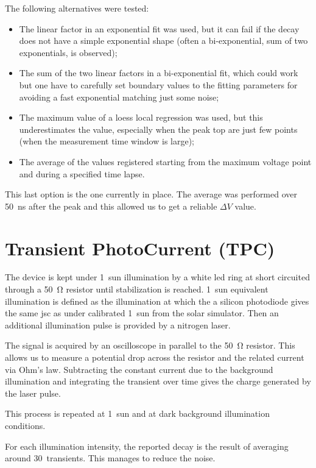 The following alternatives were tested:
\begin{itemize}
	\item The linear factor in an exponential fit was used, but it can fail if the decay does not have a simple exponential shape (often a bi-exponential, sum of two exponentials, is observed);
	\item The sum of the two linear factors in a bi-exponential fit, which could work but one have to carefully set boundary values to the fitting parameters for avoiding a fast exponential matching just some noise;
	\item The maximum value of a \gls{loess} local regression was used, but this underestimates the value, especially when the peak top are just few points (when the measurement time window is large);
	\item The average of the values registered starting from the maximum voltage point and during a specified time lapse.
\end{itemize}

This last option is the one currently in place. The average was performed over \SI{50}{ns} after the peak and this allowed us to get a reliable $\Delta V$ value.

\section{Transient PhotoCurrent (TPC)}

The device is kept under 1~sun illumination by a white \gls{led} ring at short circuited through a \SI{50}{\ohm} resistor until stabilization is reached. 1~sun equivalent illumination is defined as the illumination at which the a silicon photodiode gives the same \gls{jsc} as under calibrated 1~sun from the solar simulator. Then an additional illumination pulse is provided by a nitrogen laser.

The signal is acquired by an oscilloscope in parallel to the \SI{50}{\ohm} resistor. This allows us to measure a potential drop across the resistor and the related current via Ohm's law. Subtracting the constant current due to the background illumination and integrating the transient over time gives the charge generated by the laser pulse.

This process is repeated at 1~sun and at dark background illumination conditions.

For each illumination intensity, the reported decay is the result of averaging around 30~transients. This manages to reduce the noise.

